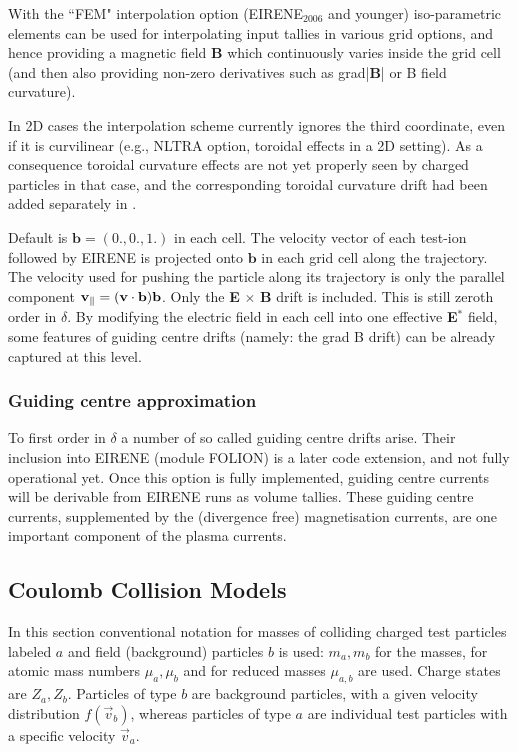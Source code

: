 With the  ``FEM" interpolation option (EIRENE$_{2006}$ and younger)
iso-parametric elements can be used for interpolating input tallies in various
grid options, and hence providing a magnetic field $\textbf{B}$ which
continuously varies inside the grid cell (and then also providing non-zero
derivatives such as grad|$\textbf{B}$| or B field curvature).

In 2D cases the interpolation scheme currently ignores the third coordinate,
even if it is curvilinear (e.g., NLTRA option, toroidal effects in a 2D
setting).
As a consequence toroidal curvature effects are not yet properly seen by
charged particles in that case, and the corresponding toroidal curvature drift
had been added separately in \cite{kn:Seebacher}.

Default is $\textbf{b}=(0.,0.,1.)$ in each cell.
The velocity vector of each test-ion followed by EIRENE is projected onto
$\textbf{b}$ in each grid cell along the trajectory.
The velocity used for pushing the particle along its trajectory is only the
parallel component $\mathbf{v}_\|=(\mathbf{v} \cdot \mathbf{b}) \mathbf{b}$.
Only the \textbf{E} $\times$ \textbf{B} drift is included.
This is still zeroth order in $\delta$.
By modifying the electric field in each cell into one effective \textbf{E$^*$}
field, some features of  guiding centre drifts (namely: the grad B drift) can
be already captured at this level.

\subsubsection{Guiding centre approximation}

To first order in $\delta$ a number of so called guiding centre drifts arise.
Their inclusion into EIRENE (module FOLION) is a later code extension, and not
fully operational yet.
Once this option is fully implemented, guiding centre currents will be
derivable from EIRENE runs as volume tallies.
These guiding centre currents, supplemented by the (divergence free)
magnetisation currents, are one important component of the plasma currents.

\subsection{Coulomb Collision Models}

In this section conventional notation for masses of colliding charged test
particles labeled $a$ and field (background) particles $b$ is used:   $m_a,
  m_b$ for the masses, for atomic mass numbers $\mu_a, \mu_b$ and for reduced
masses $\mu_{a,b}$ are used.
Charge states are $Z_a, Z_b$.
Particles of type $b$ are background particles, with a given velocity
distribution $f(\vec v_b)$, whereas particles of type $a$ are individual test
particles with a specific velocity $\vec v_a$.

